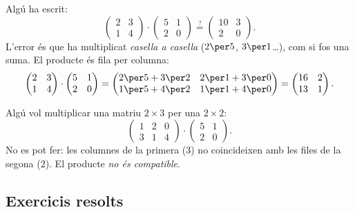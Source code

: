 \begin{exemple}
Algú ha escrit:
\[
\begin{pmatrix} 2 & 3 \\ 1 & 4 \end{pmatrix}\cdot\begin{pmatrix} 5 & 1 \\ 2 & 0 \end{pmatrix}
\overset{?}{=}\begin{pmatrix} 10 & 3 \\ 2 & 0 \end{pmatrix}.
\]
L'error és que ha multiplicat \emph{casella a casella} ($2\per 5$, $3\per 1$\dots),
com si fos una suma. El producte és fila per columna:
\[
\begin{pmatrix} 2 & 3 \\ 1 & 4 \end{pmatrix}\cdot\begin{pmatrix} 5 & 1 \\ 2 & 0 \end{pmatrix}
=\begin{pmatrix} 2\per 5+3\per 2 & 2\per 1+3\per 0 \\ 1\per 5+4\per 2 & 1\per 1+4\per 0 \end{pmatrix}
=\begin{pmatrix} 16 & 2 \\ 13 & 1 \end{pmatrix}.
\]
\end{exemple}

\begin{exemple}
Algú vol multiplicar una matriu $2\times 3$ per una $2\times 2$:
\[
\begin{pmatrix} 1 & 2 & 0 \\ 3 & 1 & 4 \end{pmatrix}\cdot\begin{pmatrix} 5 & 1 \\ 2 & 0 \end{pmatrix}.
\]
No es pot fer: les columnes de la primera ($3$) no coincideixen amb les files de
la segona ($2$). El producte \emph{no és compatible}.
\end{exemple}

\subsection{Exercicis resolts}

